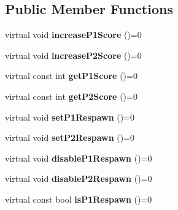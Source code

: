 \subsection*{Public Member Functions}
\begin{DoxyCompactItemize}
\item 
\hypertarget{class_game_state_data_a28ec2cf2d7dd89bab394b611a83e7d4c}{virtual void {\bfseries increase\+P1\+Score} ()=0}\label{class_game_state_data_a28ec2cf2d7dd89bab394b611a83e7d4c}

\item 
\hypertarget{class_game_state_data_a8b2470bafedd2c51cdc32199ae004b13}{virtual void {\bfseries increase\+P2\+Score} ()=0}\label{class_game_state_data_a8b2470bafedd2c51cdc32199ae004b13}

\item 
\hypertarget{class_game_state_data_ac4dbf8f19eb4abae6c6e674e1f0ad473}{virtual const int {\bfseries get\+P1\+Score} ()=0}\label{class_game_state_data_ac4dbf8f19eb4abae6c6e674e1f0ad473}

\item 
\hypertarget{class_game_state_data_a024affaa547433a0feca091d2bc516b6}{virtual const int {\bfseries get\+P2\+Score} ()=0}\label{class_game_state_data_a024affaa547433a0feca091d2bc516b6}

\item 
\hypertarget{class_game_state_data_ab8f2d792862e1292c767d5c1b41eb334}{virtual void {\bfseries set\+P1\+Respawn} ()=0}\label{class_game_state_data_ab8f2d792862e1292c767d5c1b41eb334}

\item 
\hypertarget{class_game_state_data_a3b47e49a56e053a7b346b1eafd5c46b1}{virtual void {\bfseries set\+P2\+Respawn} ()=0}\label{class_game_state_data_a3b47e49a56e053a7b346b1eafd5c46b1}

\item 
\hypertarget{class_game_state_data_a0599750aaaa0d272ba8e073d84b0e82b}{virtual void {\bfseries disable\+P1\+Respawn} ()=0}\label{class_game_state_data_a0599750aaaa0d272ba8e073d84b0e82b}

\item 
\hypertarget{class_game_state_data_a5886e86d10a106cf490eaa2433f3e3ea}{virtual void {\bfseries disable\+P2\+Respawn} ()=0}\label{class_game_state_data_a5886e86d10a106cf490eaa2433f3e3ea}

\item 
\hypertarget{class_game_state_data_a1893643563270c9ca0552761d0da1085}{virtual const bool {\bfseries is\+P1\+Respawn} ()=0}\label{class_game_state_data_a1893643563270c9ca0552761d0da1085}


\end{DoxyCompactItemize}

